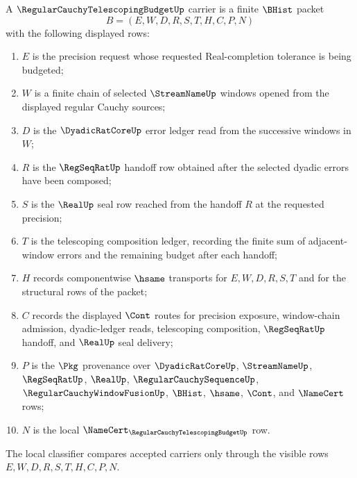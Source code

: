 \begin{definition}
\label{def:regular-cauchy-telescoping-budget-carrier}
A $\RegularCauchyTelescopingBudgetUp$ carrier is a finite $\BHist$ packet
$$
B=(E,W,D,R,S,T,H,C,P,N)
$$
with the following displayed rows:
\begin{enumerate}
\item $E$ is the precision request whose requested Real-completion tolerance is being budgeted;
\item $W$ is a finite chain of selected $\StreamNameUp$ windows opened from the displayed regular Cauchy sources;
\item $D$ is the $\DyadicRatCoreUp$ error ledger read from the successive windows in $W$;
\item $R$ is the $\RegSeqRatUp$ handoff row obtained after the selected dyadic errors have been composed;
\item $S$ is the $\RealUp$ seal row reached from the handoff $R$ at the requested precision;
\item $T$ is the telescoping composition ledger, recording the finite sum of adjacent-window errors and the remaining budget after each handoff;
\item $H$ records componentwise $\hsame$ transports for $E,W,D,R,S,T$ and for the structural rows of the packet;
\item $C$ records the displayed $\Cont$ routes for precision exposure, window-chain admission, dyadic-ledger reads, telescoping composition, $\RegSeqRatUp$ handoff, and $\RealUp$ seal delivery;
\item $P$ is the $\Pkg$ provenance over $\DyadicRatCoreUp$, $\StreamNameUp$, $\RegSeqRatUp$, $\RealUp$, $\RegularCauchySequenceUp$, $\RegularCauchyWindowFusionUp$, $\BHist$, $\hsame$, $\Cont$, and $\NameCert$ rows;
\item $N$ is the local $\NameCert_{\RegularCauchyTelescopingBudgetUp}$ row.
\end{enumerate}
The local classifier compares accepted carriers only through the visible rows $E,W,D,R,S,T,H,C,P,N$.
\end{definition}

